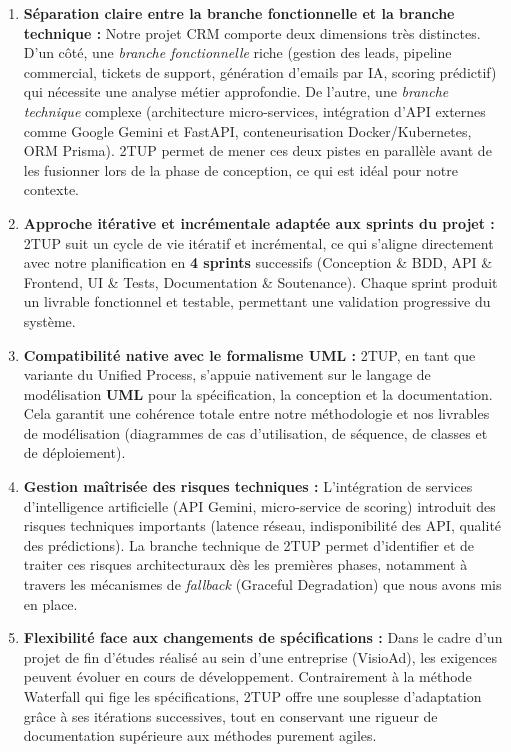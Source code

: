 \begin{enumerate}
    \item \textbf{Séparation claire entre la branche fonctionnelle et la branche technique :}
    Notre projet CRM comporte deux dimensions très distinctes. D'un côté, une \textit{branche fonctionnelle} riche (gestion des leads, pipeline commercial, tickets de support, génération d'emails par IA, scoring prédictif) qui nécessite une analyse métier approfondie. De l'autre, une \textit{branche technique} complexe (architecture micro-services, intégration d'API externes comme Google Gemini et FastAPI, conteneurisation Docker/Kubernetes, ORM Prisma). 2TUP permet de mener ces deux pistes en parallèle avant de les fusionner lors de la phase de conception, ce qui est idéal pour notre contexte.

    \item \textbf{Approche itérative et incrémentale adaptée aux sprints du projet :}
    2TUP suit un cycle de vie itératif et incrémental, ce qui s'aligne directement avec notre planification en \textbf{4 sprints} successifs (Conception \& BDD, API \& Frontend, UI \& Tests, Documentation \& Soutenance). Chaque sprint produit un livrable fonctionnel et testable, permettant une validation progressive du système.

    \item \textbf{Compatibilité native avec le formalisme UML :}
    2TUP, en tant que variante du Unified Process, s'appuie nativement sur le langage de modélisation \textbf{UML} pour la spécification, la conception et la documentation. Cela garantit une cohérence totale entre notre méthodologie et nos livrables de modélisation (diagrammes de cas d'utilisation, de séquence, de classes et de déploiement).

    \item \textbf{Gestion maîtrisée des risques techniques :}
    L'intégration de services d'intelligence artificielle (API Gemini, micro-service de scoring) introduit des risques techniques importants (latence réseau, indisponibilité des API, qualité des prédictions). La branche technique de 2TUP permet d'identifier et de traiter ces risques architecturaux dès les premières phases, notamment à travers les mécanismes de \textit{fallback} (Graceful Degradation) que nous avons mis en place.

    \item \textbf{Flexibilité face aux changements de spécifications :}
    Dans le cadre d'un projet de fin d'études réalisé au sein d'une entreprise (VisioAd), les exigences peuvent évoluer en cours de développement. Contrairement à la méthode Waterfall qui fige les spécifications, 2TUP offre une souplesse d'adaptation grâce à ses itérations successives, tout en conservant une rigueur de documentation supérieure aux méthodes purement agiles.
\end{enumerate}

